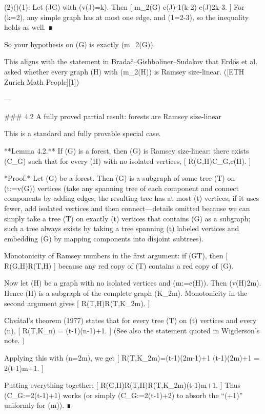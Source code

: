 (2)(\Rightarrow)(1): Let (J\subseteq G) with (v(J)=k). Then
[
\le m_2(G)
\quad\Rightarrow\quad
e(J)-1(k-2)
\quad\Rightarrow\quad
e(J)\le 2k-3.
]
For (k=2), any simple graph has at most one edge, and (1=2-3), so the inequality holds as well. ∎

So your hypothesis on (G) is exactly (m_2(G)).

This aligns with the statement in Bradač–Gishboliner–Sudakov that Erdős et al. asked whether every graph (H) with (m_2(H)) is Ramsey size-linear. ([ETH Zurich Math People][1])

---

### 4.2 A fully proved partial result: forests are Ramsey size-linear

This is a standard and fully provable special case.

**Lemma 4.2.** If (G) is a forest, then (G) is Ramsey size-linear: there exists (C_G) such that for every (H) with no isolated vertices,
[
R(G,H)\le C_G,e(H).
]

*Proof.*
Let (G) be a forest. Then (G) is a subgraph of some tree (T) on (t:=v(G)) vertices (take any spanning tree of each component and connect components by adding edges; the resulting tree has at most (t) vertices; if it uses fewer, add isolated vertices and then connect—details omitted because we can simply take a tree (T) on exactly (t) vertices that contains (G) as a subgraph; such a tree always exists by taking a tree spanning (t) labeled vertices and embedding (G) by mapping components into disjoint subtrees).

Monotonicity of Ramsey numbers in the first argument: if (G\subseteq T), then
[
R(G,H)\le R(T,H)
]
because any red copy of (T) contains a red copy of (G).

Now let (H) be a graph with no isolated vertices and (m:=e(H)). Then (v(H)\le 2m). Hence (H) is a subgraph of the complete graph (K_{2m}). Monotonicity in the second argument gives
[
R(T,H)\le R(T,K_{2m}).
]

Chvátal’s theorem (1977) states that for every tree (T) on (t) vertices and every (n),
[
R(T,K_n) = (t-1)(n-1)+1.
]
(See also the statement quoted in Wigderson’s note. )

Applying this with (n=2m), we get
[
R(T,K_{2m})=(t-1)(2m-1)+1 \le (t-1)(2m)+1 = 2(t-1)m+1.
]

Putting everything together:
[
R(G,H)\le R(T,H)\le R(T,K_{2m})(t-1)m+1.
]
Thus (C_G:=2(t-1)+1) works (or simply (C_G:=2(t-1)+2) to absorb the “(+1)” uniformly for (m)). ∎

